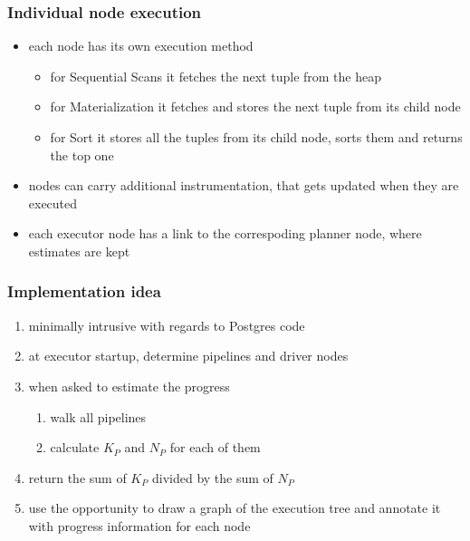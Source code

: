 \documentclass{beamer}
\begin{document}
\begin{frame}
  \frametitle{Individual node execution}

  \begin{itemize}
  \item each node has its own execution method
    \begin{itemize}
    \item for Sequential Scans it fetches the next tuple from the heap
    \item for Materialization it fetches and stores the next tuple from its
      child node
    \item for Sort it stores \alert{all} the tuples from its child node, sorts
      them and returns the top one
    \end{itemize}
  \item nodes can carry additional instrumentation, that gets updated when they
    are executed
  \item each executor node has a link to the correspoding planner node, where
    estimates are kept
  \end{itemize}
\end{frame}


\begin{frame}
  \frametitle{Implementation idea}

  \begin{enumerate}
  \item minimally intrusive with regards to Postgres code
  \item at executor startup, determine pipelines and driver nodes
  \item when asked to estimate the progress
    \begin{enumerate}
    \item walk all pipelines
    \item calculate $K_{P}$ and $N_{P}$ for each of them
    \end{enumerate}
  \item return the sum of $K_{P}$ divided by the sum of $N_{P}$
  \item use the opportunity to draw a graph of the execution tree and annotate
    it with progress information for each node
  \end{enumerate}
\end{frame}
\end{document}
